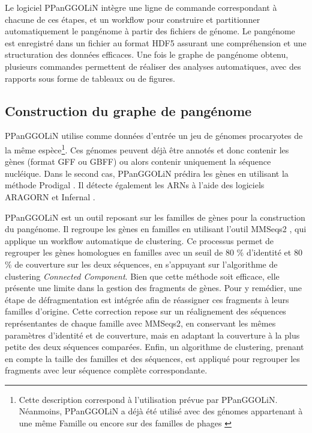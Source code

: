 Le logiciel PPanGGOLiN intègre une ligne de commande correspondant à chacune de ces étapes, et un workflow pour construire et partitionner automatiquement le pangénome à partir des fichiers de génome. Le pangénome est enregistré dans un fichier au format HDF5 assurant une compréhension et une structuration des données efficaces. Une fois le graphe de pangénome obtenu, plusieurs commandes permettent de réaliser des analyses automatiques, avec des rapports sous forme de tableaux ou de figures.

\newpage
\subsection{Construction du graphe de pangénome}

PPanGGOLiN utilise comme données d'entrée un jeu de génomes procaryotes de la même espèce\footnote{Cette description correspond à l'utilisation prévue par PPanGGOLiN. Néanmoins, PPanGGOLiN a déjà été utilisé avec des génomes appartenant à une même Famille ou encore sur des familles de phages \cite{pfeifer_bacteria_2021}}. Ces génomes peuvent déjà être annotés et donc contenir les gènes (format GFF ou GBFF) ou alors contenir uniquement la séquence nucléique. Dans le second cas, PPanGGOLiN prédira les gènes en utilisant la méthode Prodigal \cite{hyatt_prodigal_2010}. Il détecte également les ARNs à l'aide des logiciels ARAGORN et Infernal \cite{laslett_aragorn_2004,nawrocki_infernal_2013}. 

PPanGGOLiN est un outil reposant sur les familles de gènes pour la construction du pangénome. Il regroupe les gènes en familles en utilisant l’outil MMSeqs2 \cite{steinegger_mmseqs2_2017}, qui applique un workflow automatique de clustering. Ce processus permet de regrouper les gènes homologues en familles avec un seuil de 80 \% d’identité et 80 \% de couverture sur les deux séquences, en s’appuyant sur l’algorithme de clustering \textit{Connected Component}. Bien que cette méthode soit efficace, elle présente une limite dans la gestion des fragments de gènes. Pour y remédier, une étape de défragmentation est intégrée afin de réassigner ces fragments à leurs familles d’origine. Cette correction repose sur un réalignement des séquences représentantes de chaque famille avec MMSeqs2, en conservant les mêmes paramètres d’identité et de couverture, mais en adaptant la couverture à la plus petite des deux séquences comparées. Enfin, un algorithme de clustering, prenant en compte la taille des familles et des séquences, est appliqué pour regrouper les fragments avec leur séquence complète correspondante.

